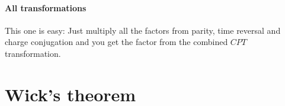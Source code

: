 \documentclass[11pt, english, fleqn, DIV=15, headinclude, BCOR=1cm]{scrartcl}
\begin{document}
\paragraph{All transformations}

This one is easy: Just multiply all the factors from parity, time reversal and
charge conjugation and you get the factor from the combined $CPT$
transformation.

\section{Wick's theorem}
\label{homework:2}
\end{document}
